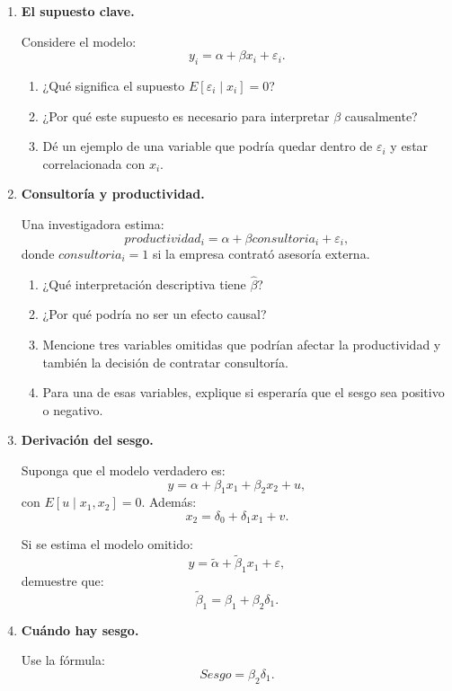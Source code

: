 \documentclass[11pt]{article}
\begin{document}
\begin{enumerate}[label=\textbf{Ejercicio \arabic*.}, leftmargin=*]

\item \textbf{El supuesto clave.}

Considere el modelo:
\[
y_i=\alpha+\beta x_i+\varepsilon_i.
\]

\begin{enumerate}[label=\alph*)]
    \item ¿Qué significa el supuesto $E[\varepsilon_i\mid x_i]=0$?
    \item ¿Por qué este supuesto es necesario para interpretar $\beta$ causalmente?
    \item Dé un ejemplo de una variable que podría quedar dentro de $\varepsilon_i$ y estar correlacionada con $x_i$.
\end{enumerate}

\item \textbf{Consultoría y productividad.}

Una investigadora estima:
\[
productividad_i=\alpha+\beta consultoria_i+\varepsilon_i,
\]
donde $consultoria_i=1$ si la empresa contrató asesoría externa.

\begin{enumerate}[label=\alph*)]
    \item ¿Qué interpretación descriptiva tiene $\hat{\beta}$?
    \item ¿Por qué podría no ser un efecto causal?
    \item Mencione tres variables omitidas que podrían afectar la productividad y también la decisión de contratar consultoría.
    \item Para una de esas variables, explique si esperaría que el sesgo sea positivo o negativo.
\end{enumerate}

\item \textbf{Derivación del sesgo.}

Suponga que el modelo verdadero es:
\[
y=\alpha+\beta_1x_1+\beta_2x_2+u,
\]
con $E[u\mid x_1,x_2]=0$. Además:
\[
x_2=\delta_0+\delta_1x_1+v.
\]

Si se estima el modelo omitido:
\[
y=\tilde{\alpha}+\tilde{\beta}_1x_1+\varepsilon,
\]
demuestre que:
\[
\tilde{\beta}_1=\beta_1+\beta_2\delta_1.
\]

\item \textbf{Cuándo hay sesgo.}

Use la fórmula:
\[
Sesgo=\beta_2\delta_1.
\]


\end{enumerate}
\end{document}
